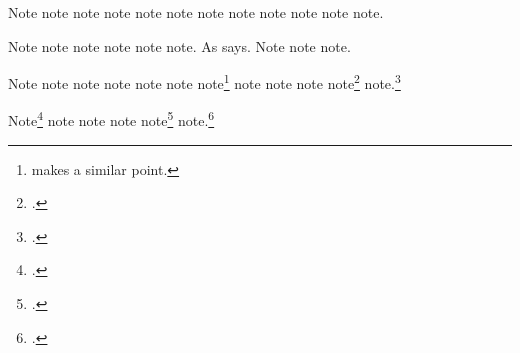 \documentclass[a4paper,12pt]{report}
\begin{document}
Note\autocite{viv:amlen} note\autocite{wallraff:word}
note\autocite{unsigned:ranke} note\autocite{warr:ellison}
note\autocite{herwign:office} note\autocite{wallraff:word}
note\autocite{verdi:corsaro} note\autocite{wauchope:ceramics}
note\autocite{viv:amlen} note\autocite{weed:flatiron}
note\autocite{weresz} note\autocite{white:callimachus}.

Note\autocite{white:ross:memo} note\autocite{warr:ellison}
note\autocite{weed:flatiron} note\autocite{wikiped:bibtex}
note\autocite{will:cohere} note\autocite{wauchope:ceramics}.  As
\textcite{zukowsky:chicago} says.  Note\autocite{weresz}
note\autocite{white:russ} note\autocite{w3c:xml}.

Note\autocite{white:callimachus} note\autocite{white:ross:memo}
note\autocite{white:russ} note\autocite[BibTeX]{wikiped:bibtex}
note\autocite{will:cohere} note\autocite{w3c:xml}
note\footnote{\textcite{zukowsky:chicago} makes a similar point.}
note\autocites[See][3.2.996b5--8]{aristotle:metaphy:gr}[360e--361b]
{plato:republic:gr}[and also][for additional
information]{white:callimachus} note\autocite{aristotle:metaphy:trans}
note\autocites[See][]{mchugh:wake}[and][569]{warr:ellison}
note\footnote{.}
note.\footnote{.}

Note\footnote{.}
note\autocite[3:126]{meredith:letters} note
note\autocite[2]{weresz} note\footnote{.}
note.\footnote{\cite*{zukowsky:chicago}.}
\nocite{furet:related,house:papers}

\printshorthands

\printbibliography[notkeyword=original]
\end{document}
